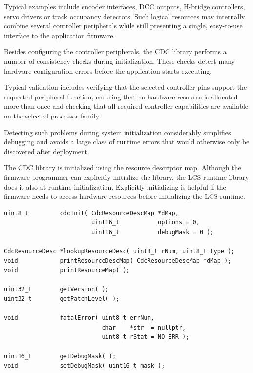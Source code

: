 Typical examples include encoder interfaces, DCC outputs, H-bridge controllers,
servo drivers or track occupancy detectors. Such logical resources
may internally combine several controller peripherals while still presenting a
single, easy-to-use interface to the application firmware.


Besides configuring the controller peripherals, the CDC library performs a
number of consistency checks during initialization. These checks detect many
hardware configuration errors before the application starts executing.

Typical validation includes verifying that the selected controller pins support
the requested peripheral function, ensuring that no hardware resource is
allocated more than once and checking that all required controller capabilities
are available on the selected processor family.

Detecting such problems during system initialization considerably simplifies
debugging and avoids a large class of runtime errors that would otherwise only
be discovered after deployment.


The CDC library is initialized using the resource descriptor map. Although
the firmware programmer can explicitly initialize the library, the LCS runtime
library does it also at runtime initialization. 
Explicitly initializing is helpful if the firmware needs to access hardware
resources before initializing the LCS runtime.

\lstset{language=c++, style=api-interface}
\begin{lstlisting}
uint8_t         cdcInit( CdcResourceDescMap *dMap, 
                         uint16_t           options = 0, 
                         uint16_t           debugMask = 0 );

CdcResourceDesc *lookupResourceDesc( uint8_t rNum, uint8_t type );
void            printResourceDescMap( CdcResourceDescMap *dMap );
void            printResourceMap( );

uint32_t        getVersion( );
uint32_t        getPatchLevel( );

void            fatalError( uint8_t errNum, 
                            char    *str  = nullptr,  
                            uint8_t rStat = NO_ERR );

uint16_t        getDebugMask( );
void            setDebugMask( uint16_t mask );
\end{lstlisting}
\FloatBarrier

